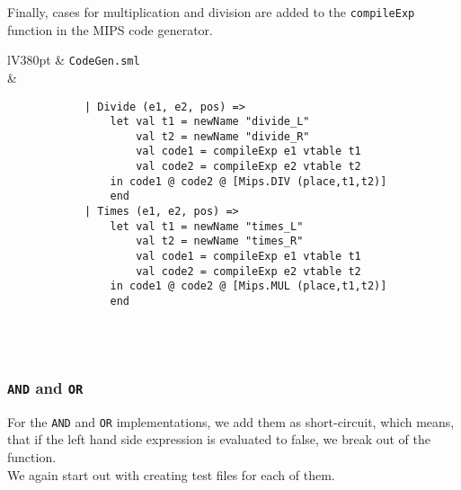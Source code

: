 \documentclass[a4paper]{article}
\begin{document}
Finally, cases for multiplication and division are added to the \verb|compileExp| function in the MIPS code generator.

\begin{center}	
	\begin{tabular}{lV{380pt}}
		\toprule
		& \verb|CodeGen.sml|\\
		\midrule
		&
		\begin{verbatim}
			| Divide (e1, e2, pos) =>
			    let val t1 = newName "divide_L"
			        val t2 = newName "divide_R"
			        val code1 = compileExp e1 vtable t1
			        val code2 = compileExp e2 vtable t2
			    in code1 @ code2 @ [Mips.DIV (place,t1,t2)]
			    end
			| Times (e1, e2, pos) =>
			    let val t1 = newName "times_L"
			        val t2 = newName "times_R"
			        val code1 = compileExp e1 vtable t1
			        val code2 = compileExp e2 vtable t2
			    in code1 @ code2 @ [Mips.MUL (place,t1,t2)]
			    end
		\end{verbatim}
		\\
		\bottomrule \\
	\end{tabular}
\end{center}

\subsubsection{\texttt{AND} and \texttt{OR}}
For the \texttt{AND} and \texttt{OR} implementations, we add them as short-circuit, which means, that if the left hand side expression is evaluated to false, we break out of the function.\\
We again start out with creating test files for each of them.\\
\end{document}
